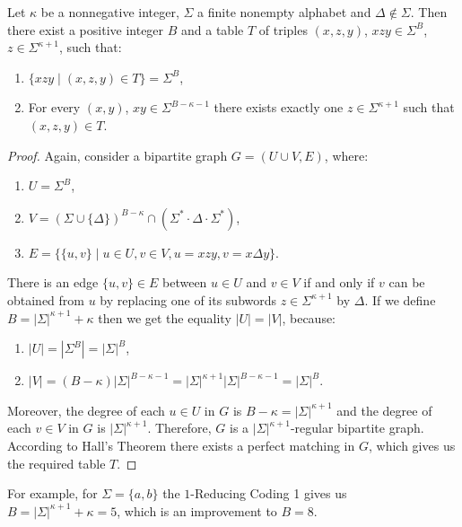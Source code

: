 \begin{theorem}
\label{theorem:dxclra_k_reducing_coding_1}
Let $\kappa$ be a nonnegative integer, $\Sigma$ a finite nonempty alphabet and $\Delta \notin \Sigma$. Then there exist a positive integer $B$ and a table $T$ of triples $(x, z, y)$, $xzy \in \Sigma^B$, $z \in \Sigma^{\kappa+1}$, such that:
\begin{enumerate}
\item\label{theorem:dxclra_k_reducing_coding_1:a} $\{ xzy \mid (x, z, y) \in T \} = \Sigma^B$,
\item\label{theorem:dxclra_k_reducing_coding_1:b} For every $(x, y)$, $xy \in \Sigma^{B-\kappa-1}$ there exists exactly one $z \in \Sigma^{\kappa+1}$ such that $(x, z, y) \in T$.
\end{enumerate}
\end{theorem}

\begin{proof}
Again, consider a bipartite graph $G = (U \cup V, E)$, where:
\begin{enumerate}
\item $U = \Sigma^B$,
\item $V = (\Sigma \cup \{\Delta\})^{B-\kappa} \cap (\Sigma^* \cdot \Delta \cdot \Sigma^*)$,
\item $E = \{ \{u, v\} \mid u \in U, v \in V, u = xzy, v = x \Delta y\}$.
\end{enumerate}
There is an edge $\{u, v\} \in E$ between $u \in U$ and $v \in V$ if and only if $v$ can be obtained from $u$ by replacing one of its subwords $z \in \Sigma^{\kappa+1}$ by $\Delta$. If we define $B = |\Sigma|^{\kappa+1} + \kappa$ then we get the equality $|U| = |V|$, because:
\begin{enumerate}
\item $|U| = |\Sigma^B| = |\Sigma|^B$,
\item $|V| = (B - \kappa) |\Sigma|^{B - \kappa - 1} = |\Sigma|^{\kappa+1} |\Sigma|^{B - \kappa - 1} = |\Sigma|^B$.
\end{enumerate}
Moreover, the degree of each $u \in U$ in $G$ is $B - \kappa = |\Sigma|^{\kappa+1}$ and the degree of each $v \in V$ in $G$ is $|\Sigma|^{\kappa+1}$. Therefore, $G$ is a $|\Sigma|^{\kappa+1}$-regular bipartite graph. According to Hall's Theorem \cite{Hall1935} there exists a perfect matching in $G$, which gives us the required table $T$.
\end{proof}

For example, for $\Sigma = \{a, b\}$ the $1$-Reducing Coding 1 gives us $B = |\Sigma|^{\kappa+1} + \kappa = 5$, which is an improvement to $B = 8$.

